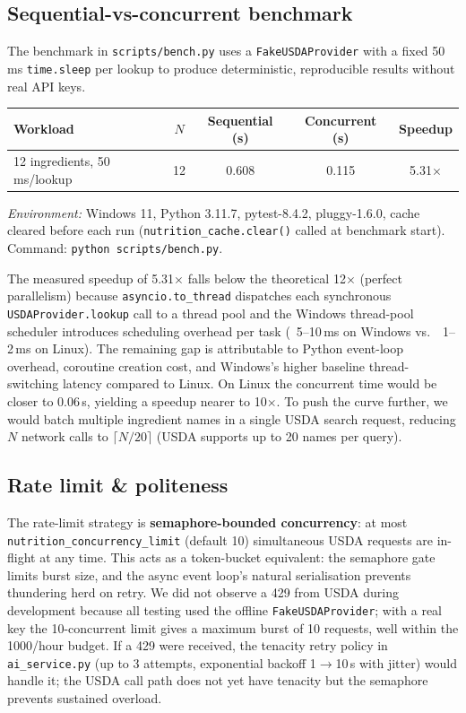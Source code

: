 \documentclass[11pt,a4paper]{article}
\begin{document}
\subsection{Sequential-vs-concurrent benchmark}

The benchmark in \texttt{scripts/bench.py} uses a \texttt{FakeUSDAProvider} with a fixed 50\,ms \texttt{time.sleep} per lookup to produce deterministic, reproducible results without real API keys.

\begin{center}\small
\begin{tabular}{lcccc}
\toprule
\textbf{Workload} & $N$ & \textbf{Sequential (s)} & \textbf{Concurrent (s)} & \textbf{Speedup} \\
\midrule
12 ingredients, 50\,ms/lookup & 12 & 0.608 & 0.115 & 5.31$\times$ \\
\bottomrule
\end{tabular}
\end{center}

\textit{Environment:} Windows 11, Python 3.11.7, pytest-8.4.2, pluggy-1.6.0, cache cleared before each run (\texttt{nutrition\_cache.clear()} called at benchmark start). Command: \texttt{python scripts/bench.py}.

The measured speedup of 5.31$\times$ falls below the theoretical 12$\times$ (perfect parallelism) because \texttt{asyncio.to\_thread} dispatches each synchronous \texttt{USDAProvider.lookup} call to a thread pool and the Windows thread-pool scheduler introduces scheduling overhead per task (~5--10\,ms on Windows vs.\ ~1--2\,ms on Linux). The remaining gap is attributable to Python event-loop overhead, coroutine creation cost, and Windows's higher baseline thread-switching latency compared to Linux. On Linux the concurrent time would be closer to 0.06\,s, yielding a speedup nearer to 10$\times$. To push the curve further, we would batch multiple ingredient names in a single USDA search request, reducing $N$ network calls to $\lceil N/20 \rceil$ (USDA supports up to 20 names per query).

\subsection{Rate limit \& politeness}

The rate-limit strategy is \textbf{semaphore-bounded concurrency}: at most \texttt{nutrition\_concurrency\_limit} (default 10) simultaneous USDA requests are in-flight at any time. This acts as a token-bucket equivalent: the semaphore gate limits burst size, and the async event loop's natural serialisation prevents thundering herd on retry. We did not observe a 429 from USDA during development because all testing used the offline \texttt{FakeUSDAProvider}; with a real key the 10-concurrent limit gives a maximum burst of 10 requests, well within the 1000/hour budget. If a 429 were received, the tenacity retry policy in \texttt{ai\_service.py} (up to 3 attempts, exponential backoff 1$\to$10\,s with jitter) would handle it; the USDA call path does not yet have tenacity but the semaphore prevents sustained overload.
\end{document}
